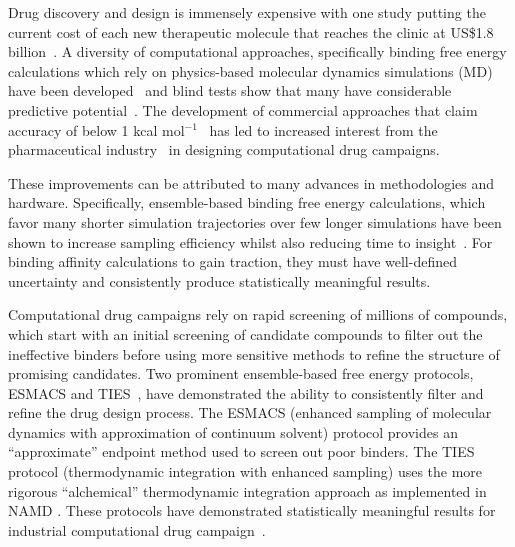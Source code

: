 Drug discovery and design is immensely expensive with one study putting the
current cost of each new therapeutic molecule that reaches the clinic at
US\$1.8 billion~\cite{Paul2010}. A diversity of computational approaches,
specifically binding free energy calculations which rely on physics-based
molecular dynamics simulations (MD) have been developed~\cite{Mobley2012} and
blind tests show that many have considerable predictive
potential~\cite{Mey2017,Yin2017}. The development of commercial approaches
that claim accuracy of below 1 kcal mol$^{-1}$~\cite{Wang2015} has led to
increased interest from the pharmaceutical industry~\cite{Ganesan2017} in
designing computational drug campaigns.

These improvements can be attributed to many advances in methodologies and
hardware. Specifically, ensemble-based binding free energy calculations, which
favor many shorter simulation trajectories over few longer simulations have been
shown to increase sampling efficiency whilst also reducing time to
insight~\cite{weis_ligand_2006}. For binding
affinity calculations to gain traction, they must have well-defined uncertainty
and consistently produce statistically meaningful results.

Computational drug campaigns rely on rapid screening of millions of
compounds, which start with an initial screening of candidate compounds to
filter out the ineffective binders before using more sensitive methods to
refine the structure of promising candidates. Two prominent ensemble-based
free energy protocols, ESMACS and TIES~\cite{Bhati2017}, have demonstrated
the ability to consistently filter and refine the drug design process. The
ESMACS (enhanced sampling of molecular dynamics with approximation of
continuum solvent) protocol provides an ``approximate'' endpoint method used
to screen out poor binders. The TIES protocol (thermodynamic integration with
enhanced sampling) uses the more rigorous ``alchemical'' thermodynamic
integration approach as implemented in NAMD \cite{Phillips2005, Straatsma1991}. 
These protocols have demonstrated statistically meaningful results for 
industrial computational drug campaign~\cite{Wan2017brd4}.

